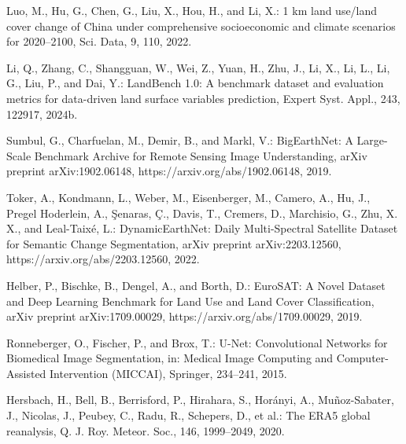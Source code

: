 \begin{thebibliography}{}
Luo, M., Hu, G., Chen, G., Liu, X., Hou, H., and Li, X.: 1 km land use/land
cover change of China under comprehensive socioeconomic and climate scenarios
for 2020--2100, Sci. Data, 9, 110, 2022.


Li, Q., Zhang, C., Shangguan, W., Wei, Z., Yuan, H., Zhu, J., Li, X., Li, L.,
Li, G., Liu, P., and Dai, Y.: LandBench 1.0: A benchmark dataset and evaluation
metrics for data-driven land surface variables prediction, Expert Syst. Appl.,
243, 122917, 2024b.

Sumbul, G., Charfuelan, M., Demir, B., and Markl, V.: BigEarthNet: A
Large-Scale Benchmark Archive for Remote Sensing Image Understanding, arXiv
preprint arXiv:1902.06148, https://arxiv.org/abs/1902.06148, 2019.

Toker, A., Kondmann, L., Weber, M., Eisenberger, M., Camero, A., Hu, J.,
Pregel Hoderlein, A., {\c{S}}enaras, {\c{C}}., Davis, T., Cremers, D.,
Marchisio, G., Zhu, X. X., and Leal-Taix{\'e}, L.: DynamicEarthNet: Daily
Multi-Spectral Satellite Dataset for Semantic Change Segmentation, arXiv
preprint arXiv:2203.12560, https://arxiv.org/abs/2203.12560, 2022.

Helber, P., Bischke, B., Dengel, A., and Borth, D.: EuroSAT: A Novel Dataset
and Deep Learning Benchmark for Land Use and Land Cover Classification, arXiv
preprint arXiv:1709.00029, https://arxiv.org/abs/1709.00029, 2019.


Ronneberger, O., Fischer, P., and Brox, T.: U-Net: Convolutional Networks for
Biomedical Image Segmentation, in: Medical Image Computing and
Computer-Assisted Intervention (MICCAI), Springer, 234--241, 2015.


Hersbach, H., Bell, B., Berrisford, P., Hirahara, S., Hor{\'a}nyi, A.,
Mu{\~n}oz-Sabater, J., Nicolas, J., Peubey, C., Radu, R., Schepers, D., et al.:
The ERA5 global reanalysis, Q. J. Roy. Meteor. Soc., 146, 1999--2049, 2020.


\end{thebibliography}
